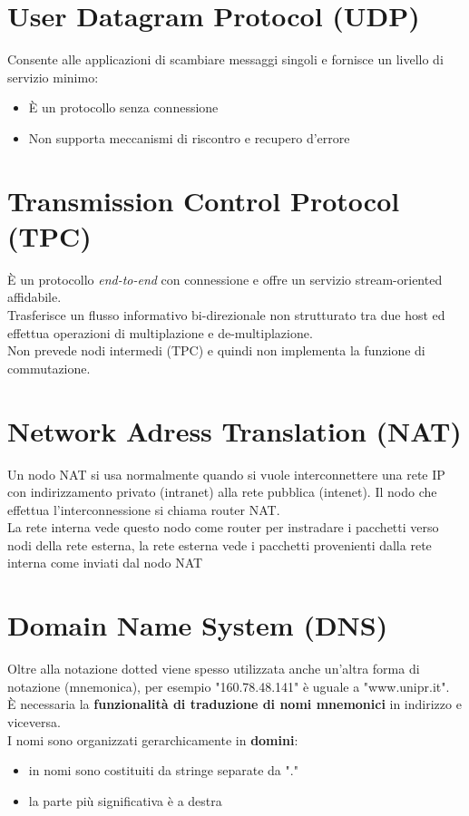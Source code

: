 \documentclass[italian,12pt,a4paper]{article}
\begin{document}
\section{User Datagram Protocol (UDP)}
Consente alle applicazioni di scambiare messaggi singoli e fornisce un livello di servizio minimo:
\begin{itemize}
	\item È un protocollo senza connessione
	\item Non supporta meccanismi di riscontro e recupero d'errore 
\end{itemize}
\section{Transmission Control Protocol (TPC)}
È un protocollo \textit{end-to-end} con connessione e offre un servizio stream-oriented affidabile.\\
Trasferisce un flusso informativo bi-direzionale non strutturato tra due host ed effettua operazioni di multiplazione e de-multiplazione.\\
Non prevede nodi intermedi (TPC) e quindi non implementa la funzione di commutazione.\\
\section{Network Adress Translation (NAT)}
Un nodo NAT si usa normalmente quando si vuole interconnettere una rete IP con indirizzamento privato (intranet) alla rete pubblica (intenet). Il nodo che effettua l'interconnessione si chiama router NAT.\\
La rete interna vede questo nodo come router per instradare i pacchetti verso nodi della rete esterna, la rete esterna vede i pacchetti provenienti dalla rete interna come inviati dal nodo NAT
\section{Domain Name System (DNS)}
Oltre alla notazione dotted viene spesso utilizzata anche un'altra forma di notazione (mnemonica), per esempio "160.78.48.141" è uguale a "www.unipr.it".\\
È necessaria la \textbf{funzionalità di traduzione di nomi mnemonici} in indirizzo e viceversa.\\
I nomi sono organizzati gerarchicamente in \textbf{domini}:
\begin{itemize}
	\item in nomi sono costituiti da stringe separate da "."
	\item la parte più significativa è a destra
\end{itemize}
\end{document}
